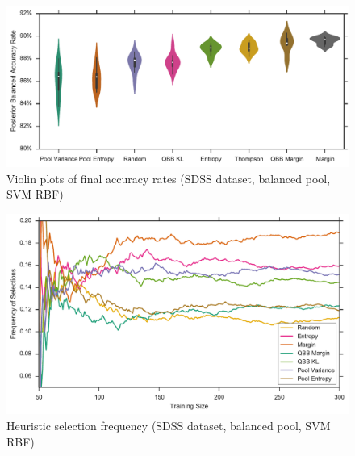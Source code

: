 \begin{figure}[p]
	\centering
	\includegraphics[width=\textwidth]{figures/5_active/sdss_br_ind_violin}
	\caption[Violin plots of final accuracy rates (SDSS, balanced, SVM RBF)]{
		Violin plots of final accuracy rates (SDSS dataset, balanced pool, SVM RBF)}
	\label{fig:sdss_br_ind_violin}
\end{figure}

\begin{figure}[p]
	\centering
	\includegraphics[width=\textwidth]{figures/5_thompson/sdss_br_frequencies}
	\caption[Heuristic selection frequency (SDSS, balanced, SVM RBF)]{
		Heuristic selection frequency (SDSS dataset, balanced pool, SVM RBF)}
	\label{fig:sdss_br_frequencies}
\end{figure}

